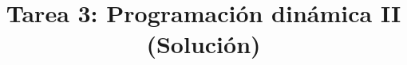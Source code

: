\documentclass{doc}
\title{Tarea 3: Programación dinámica II (Solución)}
\begin{document}
\makedocheader
\soluciontrue

\end{document}
